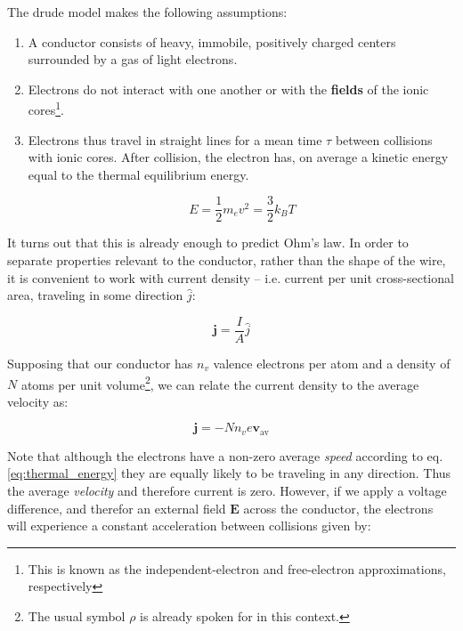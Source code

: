 \documentclass{tufte-book}
\begin{document}
The drude model makes the following assumptions:

\begin{enumerate}
  \item A conductor consists of heavy, immobile, positively charged centers surrounded by a gas of light electrons.
  \item Electrons do not interact with one another or with the \textbf{fields} of the ionic cores\footnote{This is known as the independent-electron and free-electron approximations, respectively}.
  \item Electrons thus travel in straight lines for a mean time $\tau$ between collisions with ionic cores. After collision, the electron has, on average a kinetic energy equal to the thermal equilibrium energy.

  \begin{equation}
    \label{eq:thermal_energy}
    E = \frac{1}{2}m_ev^2 = \frac{3}{2}k_BT
  \end{equation}
\end{enumerate}

It turns out that this is already enough to predict Ohm's law. In order to separate properties relevant to the conductor, rather than the shape of the wire, it is convenient to work with current density -- i.e. current per unit cross-sectional area, traveling in some direction $\hat{j}$:

\begin{equation}
\label{eq:current_density}
\textbf{j} = \frac{I}{A}\hat{j}
\end{equation}

Supposing that our conductor has $n_v$ valence electrons per atom and a density of $N$ atoms per unit volume\footnote{The usual symbol $\rho$ is already spoken for in this context.}, we can relate the current density to the average velocity as:

\begin{equation}
\label{eq:current_density_velocity}
\textbf{j} = -Nn_ve\textbf{v}_\text{av}
\end{equation}

Note that although the electrons have a non-zero average \textit{speed} according to eq. \ref{eq:thermal_energy} they are equally likely to be traveling in any direction. Thus the average \textit{velocity} and therefore current is zero. However, if we apply a voltage difference, and therefor an external field $\textbf{E}$ across the conductor, the electrons will experience a constant acceleration between collisions given by:
\end{document}
